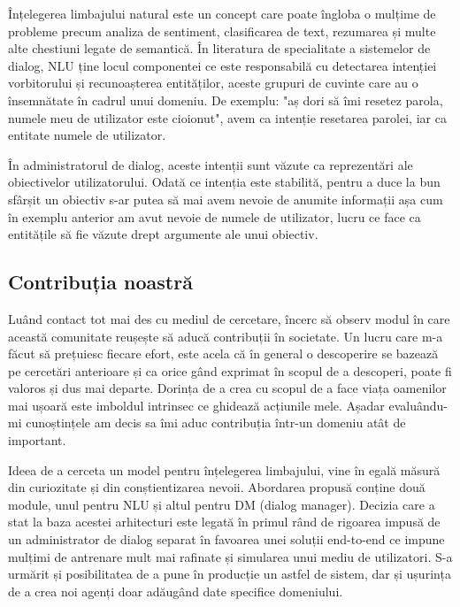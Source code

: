 Înțelegerea limbajului natural este un concept care poate îngloba o mulțime de probleme precum analiza de sentiment, clasificarea de text, rezumarea și multe alte chestiuni legate de semantică. În literatura de specialitate a sistemelor de dialog, NLU ține locul componentei ce este responsabilă cu detectarea intenției vorbitorului și recunoașterea entităților, aceste grupuri de cuvinte care au o însemnătate în cadrul unui domeniu.
De exemplu: "aș dori să îmi resetez parola, numele meu de utilizator este cioionut", avem ca intenție resetarea parolei, iar ca entitate numele de utilizator.

În administratorul de dialog, aceste intenții sunt văzute ca reprezentări ale obiectivelor utilizatorului. Odată ce intenția este stabilită, pentru a duce la bun sfârșit un obiectiv s-ar putea să mai avem nevoie de anumite informații așa cum în exemplu anterior am avut nevoie de numele de utilizator, lucru ce face ca entitățile să fie văzute drept argumente ale unui obiectiv.

\subsection{Contribuția noastră}

Luând contact tot mai des cu mediul de cercetare, încerc să observ modul în care această comunitate reușește să aducă contribuții în societate. Un lucru care m-a făcut să prețuiesc fiecare efort, este acela că în general o descoperire se bazează pe cercetări anterioare și ca orice gând exprimat în scopul de a descoperi, poate fi valoros și dus mai departe. Dorința de a crea cu scopul de a face viața oamenilor mai ușoară este imboldul intrinsec ce ghidează acțiunile mele. Așadar evaluându-mi cunoștințele am decis sa îmi aduc contribuția într-un domeniu atât de important.

Ideea de a cerceta un model pentru înțelegerea limbajului, vine în egală măsură din curiozitate și din conștientizarea nevoii. Abordarea propusă conține două module, unul pentru NLU și altul pentru DM (dialog manager). Decizia care a stat la baza acestei arhitecturi este legată în primul rând de rigoarea impusă de un administrator de dialog separat în favoarea unei soluții end-to-end ce impune mulțimi de antrenare mult mai rafinate și simularea unui mediu de utilizatori. S-a urmărit și posibilitatea de a pune în producție un astfel de sistem, dar și ușurința de a crea noi agenți doar adăugând date specifice domeniului.


